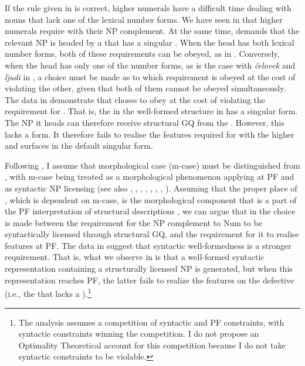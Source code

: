 \documentclass[output=paper,modfonts,newtxmath,hidelinks]{langscibook}
\begin{document}
\noindent If the rule given in  is correct,  higher numerals have a difficult time dealing with nouns that lack one of the lexical number forms. We have seen in  that higher numerals require  with their NP complement. At the same time,  demands that the relevant NP is headed by a  that has a singular . When the head  has both lexical number forms, both of these requirements can be obeyed, as in . Conversely, when the head  has only one of the number forms, as is the case with \textit{čelovek} and \textit{ljudi} in , a choice must be made as to which requirement is obeyed at the cost of violating the other, given that both of them cannot be obeyed simultaneously. The data in  demonstrate that  choses to obey  at the cost of violating the requirement for . That is, the  in the well-formed structure in  has a singular form. The NP it heads can therefore receive structural GQ from the . However, this  lacks a  form. It therefore fails to realise the   features required for  with the higher  and surfaces in the default  singular form.

Following \citet{Bobaljik2008}, I assume that morphological case (m-case) must be distinguished from , with m-case being treated as a morphological phenomenon applying at PF and  as syntactic NP licensing (see also \citealt{Harley1995}, \citealt{Marantz2000}, \citealt{McFadden2004}, \citealt{Schütze1997}, \citealt{Sigurðsson1991},  \citealt{Sigurðsson2003}, \citealt{Yip-etal1987}, \citealt{Zaenen-etal1985}). Assuming that the proper place of , which is dependent on m-case, is the morphological component that is a part of the PF interpretation of structural descriptions \citep{Bobaljik2008}, we can argue that in  the choice is made between the requirement for the NP complement to Num to be syntactically licensed through structural GQ, and the requirement for it to realise  features at PF. The data in  suggest that syntactic well-formedness is a stronger requirement. That is, what we observe in  is that a well-formed syntactic representation containing a structurally licensed NP is generated, but when this representation reaches PF, the latter fails to realize the   features on the defective  (i.e., the  that lacks a  ).\footnote{\label{18:fn6}The  analysis assumes a competition of syntactic and PF constraints, with syntactic constraints winning the competition. I do not propose an Optimality Theoretical account for this competition because I do not take syntactic constraints to be violable.}
\end{document}
